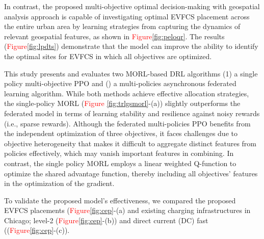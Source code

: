 \documentclass[preprint,12pt]{elsarticle}
\begin{document}
In contrast, the proposed multi-objective optimal decision-making with geospatial analysis approach is capable of investigating optimal EVFCS placement across the entire urban area by learning strategies from capturing the dynamics of relevant geospatial features, as shown in \textcolor{red}{Figure}\ref{fig:peloqr}. The results (\textcolor{red}{Figure}\ref{fig:lpdts}) demonstrate that the model can improve the ability to identify the optimal sites for EVFCS in which all objectives are optimized.

This study presents and evaluates two MORL-based DRL algorithms (1) a single policy multi-objective PPO and () a multi-policies asynchronous federated learning algorithm. While both methods achieve effective allocation strategies, the single-policy MORL (\textcolor{red}{Figure \ref{fig:trlgsmorl}}-(a)) slightly outperforms the federated model in terms of learning stability and resilience against noisy rewards (i.e., sparse rewards). Although the federated multi-policies PPO benefits from the independent optimization of three objectives, it faces challenges due to objective heterogeneity that makes it difficult to aggregate distinct features from policies effectively, which may vanish important features in combining. In contrast, the single policy MORL employs a linear weighted Q-function to optimize the shared advantage function, thereby including all objectives' features in the optimization of the gradient. 

To validate the proposed model's effectiveness, we compared the proposed EVFCS placements (\textcolor{red}{Figure}\ref{fig:cep}-(a) and existing charging infrastructures in Chicago; level-2 (\textcolor{red}{Figure}\ref{fig:cep}-(b)) and direct current (DC) fast ((\textcolor{red}{Figure}\ref{fig:cep}-(c)). 
\end{document}

